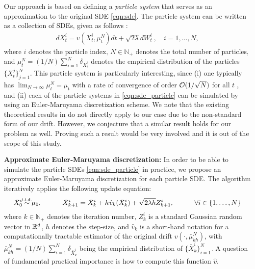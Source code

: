 Our approach is based on defining a \emph{particle system} that serves as an approximation to the original SDE \eqref{eqn:sde}. The particle system can be written as a collection of SDEs, given as follows \cite{bossy1997stochastic}:
\begin{align}
d X_t^i = v(X_t^i, \mu_t^{N}) dt + \sqrt{2 \lambda } d W_t^i \> , \quad i = 1,\dots, N, \label{eqn:sde_particle}
\end{align}
where $i$ denotes the particle index, $N \in \mathbb{N}_+$ denotes the total number of particles, and $\mu_t^N = (1/N) \sum_{i=1}^N \delta_{X_t^i}$ denotes the empirical distribution of the particles $\{X_t^j\}_{j=1}^N$. This particle system is particularly interesting, since (i) one typically has $\lim_{N \rightarrow \infty} \mu_t^{N}= \mu_t $ with a rate of convergence of order ${\cal O}(1/\sqrt{N})$ for all $t$ \cite{malrieu03,cgm-08}, and (ii) each of the particle systems in \eqref{eqn:sde_particle} can be simulated by using an Euler-Maruyama discretization scheme. We note that the existing theoretical results in \cite{veretennikov2006ergodic,mishura2016existence} do not directly apply to our case due to the non-standard form of our drift. However, we conjecture that a similar result holds for our problem as well. Proving such a result would be very involved and it is out of the scope of this study. %

\textbf{Approximate Euler-Maruyama discretization:}
%
In order to be able to simulate the particle SDEs \eqref{eqn:sde_particle} in practice, we propose an approximate Euler-Maruyama discretization for each particle SDE. 
The algorithm iteratively applies the following update equation:
\begin{align}
\bar{X}^i_0 \simiid \mu_0, \quad \qquad \bar{X}^i_{k+1} = \bar{X}^i_k + h \hspace{0.5pt} \hat{v}_k(\bar{X}^i_k) + \sqrt{2 \lambda h} Z^i_{k+1}, \quad \qquad  \forall i \in  \{1,\dots,N\} \label{eqn:euler_particle}
\end{align}
where $k \in \mathbb{N}_+$ denotes the iteration number, $Z^i_k$ is a standard Gaussian random vector in $\mathbb{R}^d$, $h$ denotes the step-size, and $\hat{v}_k$ is a short-hand notation for a computationally tractable estimator of the original drift $v(\cdot, \bar{\mu}_{kh}^N)$, with $\bar{\mu}_{kh}^{N} = (1/N) \sum_{i=1}^N \delta_{\bar{X}_k^i}$ being the empirical distribution of $\{\bar{X}_k^i\}_{i=1}^N$. A question of fundamental practical importance is how to compute this function $\hat{v}$.


